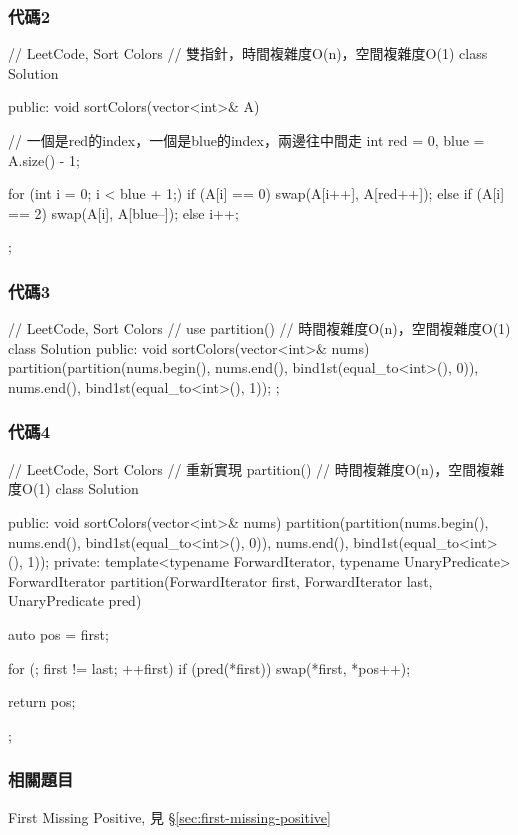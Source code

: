 \subsubsection{代碼2}
\begin{Code}
// LeetCode, Sort Colors
// 雙指針，時間複雜度O(n)，空間複雜度O(1)
class Solution {
public:
    void sortColors(vector<int>& A) {
        // 一個是red的index，一個是blue的index，兩邊往中間走
        int red = 0, blue = A.size() - 1;

        for (int i = 0; i < blue + 1;) {
            if (A[i] == 0)
                swap(A[i++], A[red++]);
            else if (A[i] == 2)
                swap(A[i], A[blue--]);
            else
                i++;
        }
    }
};
\end{Code}


\subsubsection{代碼3}
\begin{Code}
// LeetCode, Sort Colors
// use partition()
// 時間複雜度O(n)，空間複雜度O(1)
class Solution {
public:
    void sortColors(vector<int>& nums) {
        partition(partition(nums.begin(), nums.end(), bind1st(equal_to<int>(), 0)),
                nums.end(), bind1st(equal_to<int>(), 1));
    }
};
\end{Code}


\subsubsection{代碼4}
\begin{Code}
// LeetCode, Sort Colors
// 重新實現 partition()
// 時間複雜度O(n)，空間複雜度O(1)
class Solution {
public:
    void sortColors(vector<int>& nums) {
        partition(partition(nums.begin(), nums.end(), bind1st(equal_to<int>(), 0)),
                 nums.end(), bind1st(equal_to<int>(), 1));
    }
private:
    template<typename ForwardIterator, typename UnaryPredicate>
    ForwardIterator partition(ForwardIterator first, ForwardIterator last,
            UnaryPredicate pred) {
        auto pos = first;

        for (; first != last; ++first)
            if (pred(*first))
                swap(*first, *pos++);

        return pos;
    }
};
\end{Code}


\subsubsection{相關題目}
\begindot
\item First Missing Positive, 見 \S \ref{sec:first-missing-positive}
\myenddot
